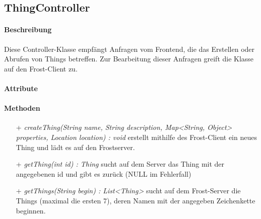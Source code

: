 \subsection{ThingController}

\paragraph{Beschreibung}
Diese Controller-Klasse empfängt Anfragen vom Frontend, die das Erstellen oder Abrufen von Things betreffen. Zur Bearbeitung dieser Anfragen greift die Klasse auf den Frost-Client zu.


\paragraph{Attribute}

\paragraph{Methoden}
\begin{itemize}
\item[+] \textit{ createThing(String name, String description, Map<String, Object> properties, Location location) : void }
erstellt mithilfe des Frost-Client ein neues Thing und lädt es auf den Frostserver.
\item[+] \textit{getThing(int id) : Thing}
sucht auf dem Server das Thing mit der angegebenen id und gibt es zurück (NULL im Fehlerfall)
\item[+] \textit{getThings(String begin) : List<Thing> }
sucht auf dem Frost-Server die Things (maximal die ersten 7), deren Namen mit der angegeben Zeichenkette beginnen.
\end{itemize}